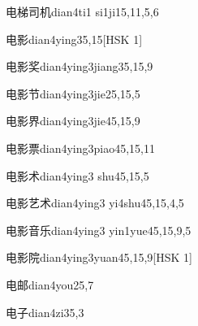 \begin{entry}{电梯司机}{dian4ti1 si1ji1}{5,11,5,6}
\end{entry}

\begin{entry}{电影}{dian4ying3}{5,15}[HSK 1]
\end{entry}

\begin{entry}{电影奖}{dian4ying3jiang3}{5,15,9}
\end{entry}

\begin{entry}{电影节}{dian4ying3jie2}{5,15,5}
\end{entry}

\begin{entry}{电影界}{dian4ying3jie4}{5,15,9}
\end{entry}

\begin{entry}{电影票}{dian4ying3piao4}{5,15,11}
\end{entry}

\begin{entry}{电影术}{dian4ying3 shu4}{5,15,5}
\end{entry}

\begin{entry}{电影艺术}{dian4ying3 yi4shu4}{5,15,4,5}
\end{entry}

\begin{entry}{电影音乐}{dian4ying3 yin1yue4}{5,15,9,5}
\end{entry}

\begin{entry}{电影院}{dian4ying3yuan4}{5,15,9}[HSK 1]
\end{entry}

\begin{entry}{电邮}{dian4you2}{5,7}
\end{entry}

\begin{entry}{电子}{dian4zi3}{5,3}
\end{entry}

